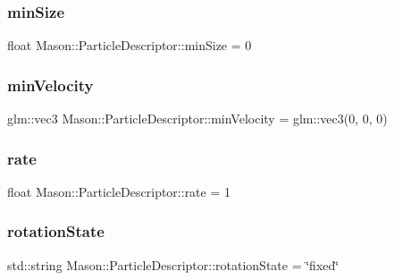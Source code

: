 \subsubsection{\texorpdfstring{min\+Size}{minSize}}
{\footnotesize\ttfamily float Mason\+::\+Particle\+Descriptor\+::min\+Size = 0}

\hypertarget{class_mason_1_1_particle_descriptor_a6412dbc10bc67e2e8b21faef1c050a67}{}\label{class_mason_1_1_particle_descriptor_a6412dbc10bc67e2e8b21faef1c050a67} 
\subsubsection{\texorpdfstring{min\+Velocity}{minVelocity}}
{\footnotesize\ttfamily glm\+::vec3 Mason\+::\+Particle\+Descriptor\+::min\+Velocity = glm\+::vec3(0, 0, 0)}

\hypertarget{class_mason_1_1_particle_descriptor_a250f9c2c5b3fa119d0a38311e301fd2a}{}\label{class_mason_1_1_particle_descriptor_a250f9c2c5b3fa119d0a38311e301fd2a} 
\subsubsection{\texorpdfstring{rate}{rate}}
{\footnotesize\ttfamily float Mason\+::\+Particle\+Descriptor\+::rate = 1}

\hypertarget{class_mason_1_1_particle_descriptor_ac192d2da527967c55804632bc6c0ca9e}{}\label{class_mason_1_1_particle_descriptor_ac192d2da527967c55804632bc6c0ca9e} 
\subsubsection{\texorpdfstring{rotation\+State}{rotationState}}
{\footnotesize\ttfamily std\+::string Mason\+::\+Particle\+Descriptor\+::rotation\+State = \char`\"{}fixed\char`\"{}}

\hypertarget{class_mason_1_1_particle_descriptor_a67edecae2a5df1c28ccc2f7cdb0a615f}{}\label{class_mason_1_1_particle_descriptor_a67edecae2a5df1c28ccc2f7cdb0a615f} 
